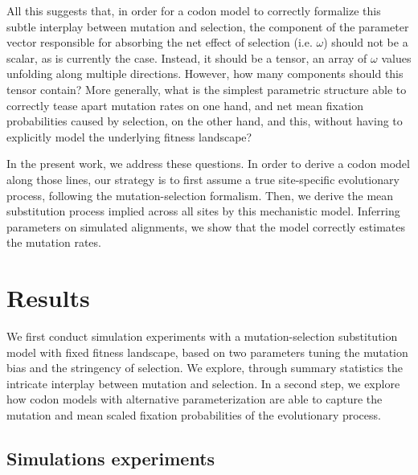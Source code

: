 All this suggests that, in order for a codon model to correctly formalize this subtle interplay between mutation and selection, the component of the parameter vector responsible for absorbing the net effect of selection (i.e. $\omega$) should not be a scalar, as is currently the case.
Instead, it should be a tensor, an array of $\omega$ values unfolding along multiple directions.
However, how many components should this tensor contain?
More generally, what is the simplest parametric structure able to correctly tease apart mutation rates on one hand, and net mean fixation probabilities caused by selection, on the other hand, and this, without having to explicitly model the underlying fitness landscape?

In the present work, we address these questions.
In order to derive a codon model along those lines, our strategy is to first assume a true site-specific evolutionary process, following the mutation-selection formalism.
Then, we derive the mean substitution process implied across all sites by this mechanistic model.
Inferring parameters on simulated alignments, we show that the model correctly estimates the mutation rates.


\section{Results}

We first conduct simulation experiments with a mutation-selection substitution model with fixed fitness landscape, based on two parameters tuning the mutation bias and the stringency of selection.
We explore, through summary statistics the intricate interplay between mutation and selection.
In a second step, we explore how codon models with alternative parameterization are able to capture the mutation and mean scaled fixation probabilities of the evolutionary process.

\subsection{Simulations experiments}

